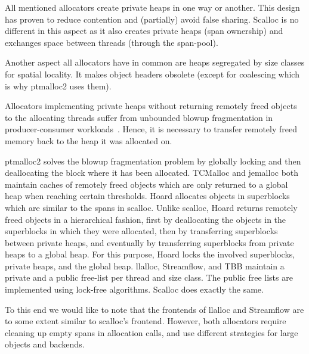 \documentclass[10pt]{sigplanconf}
\begin{document}
All mentioned allocators create private heaps in one way or another. This design
has proven to reduce contention and (partially) avoid false sharing. Scalloc is
no different in this aspect as it also creates private heaps (span ownership)
and exchanges space between threads (through the span-pool).

Another aspect all allocators have in common are heaps segregated by size
classes for spatial locality. It makes object headers obsolete (except for
coalescing which is why ptmalloc2 uses them).

Allocators implementing private heaps without returning remotely freed objects
to the allocating threads suffer from unbounded blowup fragmentation in
producer-consumer workloads~\cite{Berger:ASPLOS00}. Hence, it is necessary to
transfer remotely freed memory back to the heap it was allocated on.

ptmalloc2 solves the blowup fragmentation problem by globally locking and then
deallocating the block where it has been allocated. TCMalloc and jemalloc both
maintain caches of remotely freed objects which are only returned to a global
heap when reaching certain thresholds. Hoard allocates objects in superblocks
which are similar to the spans in scalloc. Unlike scalloc,  Hoard returns
remotely freed objects in a hierarchical fashion, first by deallocating the
objects in the superblocks in which they were allocated, then by transferring
superblocks between private heaps, and eventually by transferring superblocks
from private heaps to a global heap. For this purpose, Hoard locks the involved
superblocks, private heaps, and the global heap. llalloc, Streamflow, and TBB
maintain a private and a public free-list per thread and size class. The public
free lists are implemented using lock-free algorithms. Scalloc does exactly
the same.

To this end we would like to note that the frontends of llalloc and Streamflow are to some extent similar to scalloc's frontend. However, both allocators require
cleaning up empty spans in allocation calls, and use different strategies for
large objects and backends.
\end{document}
